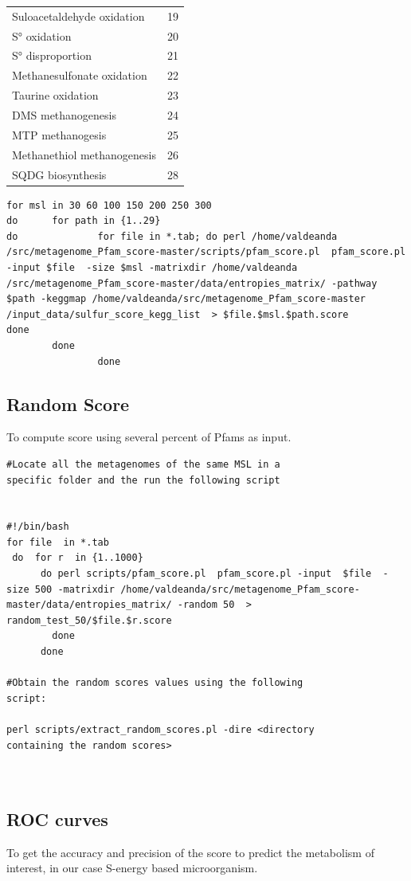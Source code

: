 \documentclass[a4paper,11pt]{report}
\begin{document}
\begin{table}[H]
\begin{tabular}{@{}lc@{}}
Suloacetaldehyde oxidation  & 19     \\
S° oxidation                & 20     \\
S° disproportion            & 21     \\
Methanesulfonate oxidation  & 22     \\
Taurine oxidation           & 23     \\
DMS methanogenesis          & 24     \\
MTP methanogesis            & 25     \\
Methanethiol methanogenesis & 26     \\
SQDG biosynthesis           & 28     \\ \bottomrule
\end{tabular}
\end{table}

\begin{verbatim}
for msl in 30 60 100 150 200 250 300   
do      for path in {1..29}
do              for file in *.tab; do perl /home/valdeanda
/src/metagenome_Pfam_score-master/scripts/pfam_score.pl  pfam_score.pl 
-input $file  -size $msl -matrixdir /home/valdeanda
/src/metagenome_Pfam_score-master/data/entropies_matrix/ -pathway 
$path -keggmap /home/valdeanda/src/metagenome_Pfam_score-master
/input_data/sulfur_score_kegg_list  > $file.$msl.$path.score 
done
        done
                done
\end{verbatim}
\subsection{Random Score}

To compute score  using several percent of Pfams as input. 

\begin{verbatim}
#Locate all the metagenomes of the same MSL in a 
specific folder and the run the following script  


#!/bin/bash
for file  in *.tab
 do  for r  in {1..1000}
      do perl scripts/pfam_score.pl  pfam_score.pl -input  $file  -size 500 -matrixdir /home/valdeanda/src/metagenome_Pfam_score-master/data/entropies_matrix/ -random 50  > random_test_50/$file.$r.score
        done
      done

#Obtain the random scores values using the following 
script: 

perl scripts/extract_random_scores.pl -dire <directory 
containing the random scores>
     


\end{verbatim}


\subsection{ROC curves}
To get the accuracy and precision of the score to predict the metabolism of interest, in our case S-energy based microorganism.
\end{document}
